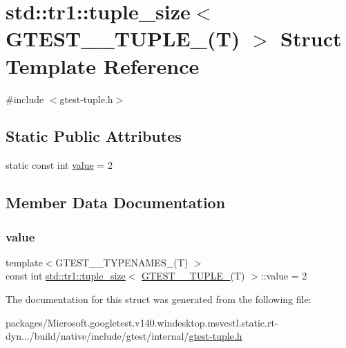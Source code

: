 \hypertarget{structstd_1_1tr1_1_1tuple__size_3_01_g_t_e_s_t__2___t_u_p_l_e___07_t_08_01_4}{}\section{std\+::tr1\+::tuple\+\_\+size$<$ G\+T\+E\+S\+T\+\_\+\_\+\+T\+U\+P\+L\+E\+\_\+(T) $>$ Struct Template Reference}
\label{structstd_1_1tr1_1_1tuple__size_3_01_g_t_e_s_t__2___t_u_p_l_e___07_t_08_01_4}


{\ttfamily \#include $<$gtest-\/tuple.\+h$>$}

\subsection*{Static Public Attributes}
\begin{DoxyCompactItemize}
\item 
static const int \mbox{\hyperlink{structstd_1_1tr1_1_1tuple__size_3_01_g_t_e_s_t__2___t_u_p_l_e___07_t_08_01_4_a18545d733fa1f811712aa1153d8ba5d9}{value}} = 2
\end{DoxyCompactItemize}


\subsection{Member Data Documentation}
\mbox{\label{structstd_1_1tr1_1_1tuple__size_3_01_g_t_e_s_t__2___t_u_p_l_e___07_t_08_01_4_a18545d733fa1f811712aa1153d8ba5d9}} 
\subsubsection{\texorpdfstring{value}{value}}
{\footnotesize\ttfamily template$<$G\+T\+E\+S\+T\+\_\+\_\+\+T\+Y\+P\+E\+N\+A\+M\+E\+S\+\_\+(\+T) $>$ \\
const int \mbox{\hyperlink{structstd_1_1tr1_1_1tuple__size}{std\+::tr1\+::tuple\+\_\+size}}$<$ \mbox{\hyperlink{namespacestd_1_1tr1_a05651180c3a4c06fe0f3b09144b82b93}{G\+T\+E\+S\+T\+\_\+\_\+\+T\+U\+P\+L\+E\+\_\+}}(T) $>$\+::value = 2\hspace{0.3cm}{\ttfamily [static]}}



The documentation for this struct was generated from the following file\+:\begin{DoxyCompactItemize}
\item 
packages/\+Microsoft.\+googletest.\+v140.\+windesktop.\+msvcstl.\+static.\+rt-\/dyn.../build/native/include/gtest/internal/\mbox{\hyperlink{gtest-tuple_8h}{gtest-\/tuple.\+h}}\end{DoxyCompactItemize}
